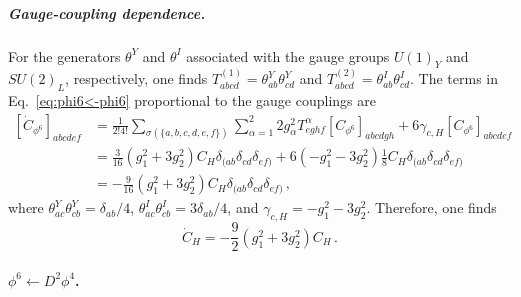 \subparagraph{Gauge-coupling dependence.}
For the generators $\theta^Y$ and $\theta^I$ associated with the gauge groups $U(1)_Y$ and $SU(2)_L$, respectively, one finds $T^{(1)}_{abcd} = \theta^Y_{ab}\theta^Y_{cd}$ and $T^{(2)}_{abcd}=\theta^I_{ab}\theta^I_{cd}$.
The terms in Eq.~\eqref{eq:phi6<-phi6} proportional to the gauge couplings are
\begin{align}
    \left[\dot C_{\phi^6}\right]_{abcdef} &=\frac{1}{2!4!}\sum_{\sigma(\{a,b,c,d,e,f\})}\sum_{\alpha=1}^2 2 g_\alpha^2 T^\alpha_{eghf}\left[ C_{\phi^6}\right]_{abcdgh} + 6 \gamma_{c,H}\left[ C_{\phi^6}\right]_{abcdef}\nonumber\\
    &= \frac{3}{16}(g_1^2+3g_2^2)C_H \delta_{(ab}\delta_{cd}\delta_{ef)} + 6 (-g_1^2-3g_2^2)\frac{1}{8}C_H  \delta_{(ab}\delta_{cd}\delta_{ef)} \nonumber\\
    &= -\frac{9}{16}(g_1^2+3g_2^2)C_H \delta_{(ab}\delta_{cd}\delta_{ef)}\,,
\end{align}
where $\theta^Y_{ac}\theta^Y_{cb} = \delta_{ab}/4$, $\theta^I_{ac}\theta^I_{cb} = 3\delta_{ab}/4$, and $\gamma_{c,H}=-g_1^2-3g_2^2$.
Therefore, one finds
\begin{equation}
    \dot C_H =  -\frac{9}{2}(g_1^2+3g_2^2)C_H \,.
\end{equation}

\paragraph{\texorpdfstring{$\phi^6 \leftarrow D^2\phi^4$}{phi6fromD2phi4}.}

